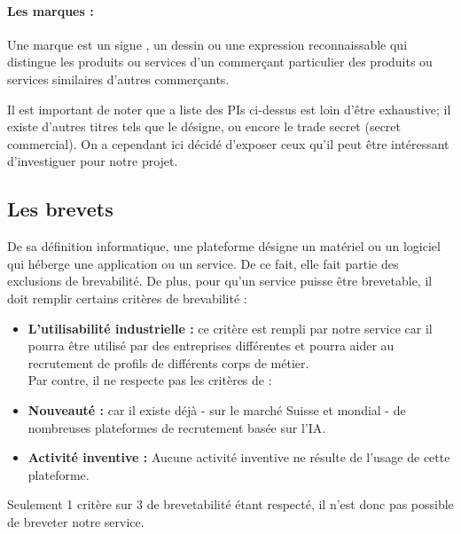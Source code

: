 \paragraph{Les marques :} Une marque est un signe , un dessin ou une expression reconnaissable qui distingue les produits ou services d'un commerçant particulier des produits ou services similaires d'autres commerçants.\newline

Il est important de noter que a liste des PIs ci-dessus est loin d'être exhaustive; il existe d’autres titres tels que le désigne, ou encore le trade secret (secret commercial). On a cependant ici décidé d'exposer ceux qu'il peut être intéressant d'investiguer pour notre projet. 

\newpage

\subsection{Les brevets}\label{subsection:les_brevets}
 
De sa définition informatique, une plateforme désigne un matériel ou un logiciel qui héberge une application ou un service. De ce fait, elle fait partie des exclusions de brevabilité. De plus, pour qu'un service puisse être brevetable, il doit remplir certains critères de brevabilité :\newline

 \begin{itemize}
     \item \textbf{L'utilisabilité industrielle :} ce critère est rempli par notre service car il pourra être utilisé par des entreprises différentes et pourra aider au recrutement de profils de différents corps de métier. \\
     Par contre, il ne respecte pas les critères de :\\
     \item \textbf{Nouveauté :} car il existe déjà - sur le marché Suisse et mondial - de nombreuses plateformes de recrutement basée sur l'IA.\\
     \item \textbf{Activité inventive :} Aucune activité inventive ne résulte de l'usage de cette plateforme. \\
 \end{itemize}
 
Seulement 1 critère sur 3 de brevetabilité étant respecté, il n'est donc pas possible de breveter notre service.

